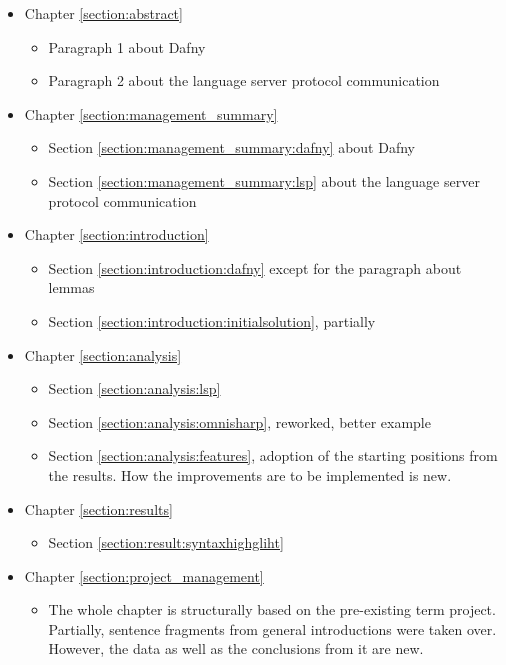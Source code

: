 \begin{itemize}
    \item Chapter \ref{section:abstract} 
        \begin{itemize}
            \item Paragraph 1 about Dafny
            \item Paragraph 2 about the language server protocol communication
        \end{itemize}

    \item Chapter \ref{section:management_summary} 
        \begin{itemize}
            \item Section \ref{section:management_summary:dafny} about Dafny
            \item Section \ref{section:management_summary:lsp} about the language server protocol communication
        \end{itemize}

    \item Chapter \ref{section:introduction} 
        \begin{itemize}
            \item Section \ref{section:introduction:dafny} except for the paragraph about lemmas
            \item Section \ref{section:introduction:initialsolution}, partially
        \end{itemize}

    \item Chapter \ref{section:analysis} 
        \begin{itemize}
            \item Section \ref{section:analysis:lsp}
            \item Section \ref{section:analysis:omnisharp}, reworked, better example
            \item Section \ref{section:analysis:features}, adoption of the starting positions from the results. How the improvements are to be implemented is new.
        \end{itemize}

    \item Chapter \ref{section:results} 
        \begin{itemize}
            \item Section \ref{section:result:syntaxhighgliht}
        \end{itemize}

    \item Chapter \ref{section:project_management} 
        \begin{itemize}
            \item The whole chapter is structurally based on the pre-existing term project.
            Partially, sentence fragments from general introductions were taken over.
            However, the data as well as the conclusions from it are new.
        \end{itemize}
\end{itemize}
